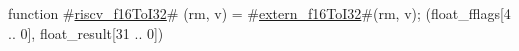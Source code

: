 function #\hyperref[sailRISCVzriscvzyf16ToI32]{riscv\_f16ToI32}# (rm, v) = {
  #\hyperref[sailRISCVzexternzyf16ToI32]{extern\_f16ToI32}#(rm, v);
  (float_fflags[4 .. 0], float_result[31 .. 0])
}
